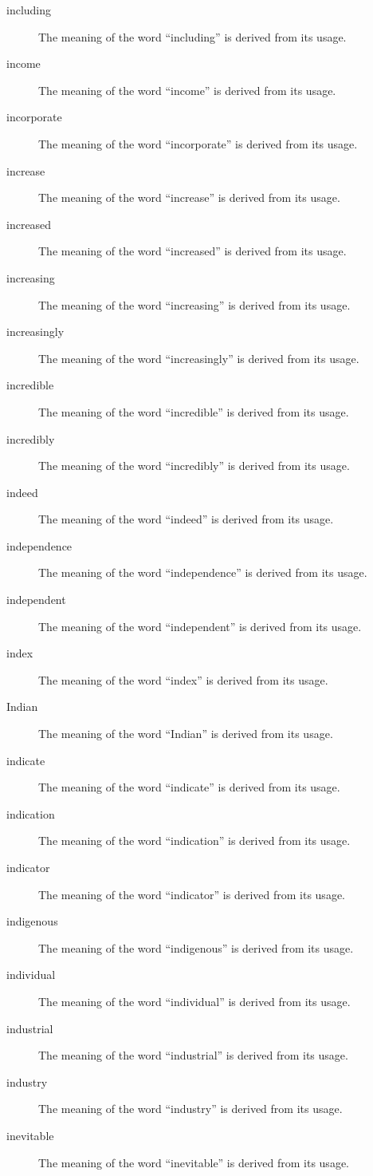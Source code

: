 \documentclass[12pt, letterpaper]{memoir}
\begin{document}
\begin{description}
\item[including] The meaning of the word ``including'' is derived from its usage.
\item[income] The meaning of the word ``income'' is derived from its usage.
\item[incorporate] The meaning of the word ``incorporate'' is derived from its usage.
\item[increase] The meaning of the word ``increase'' is derived from its usage.
\item[increased] The meaning of the word ``increased'' is derived from its usage.
\item[increasing] The meaning of the word ``increasing'' is derived from its usage.
\item[increasingly] The meaning of the word ``increasingly'' is derived from its usage.
\item[incredible] The meaning of the word ``incredible'' is derived from its usage.
\item[incredibly] The meaning of the word ``incredibly'' is derived from its usage.
\item[indeed] The meaning of the word ``indeed'' is derived from its usage.
\item[independence] The meaning of the word ``independence'' is derived from its usage.
\item[independent] The meaning of the word ``independent'' is derived from its usage.
\item[index] The meaning of the word ``index'' is derived from its usage.
\item[Indian] The meaning of the word ``Indian'' is derived from its usage.
\item[indicate] The meaning of the word ``indicate'' is derived from its usage.
\item[indication] The meaning of the word ``indication'' is derived from its usage.
\item[indicator] The meaning of the word ``indicator'' is derived from its usage.
\item[indigenous] The meaning of the word ``indigenous'' is derived from its usage.
\item[individual] The meaning of the word ``individual'' is derived from its usage.
\item[industrial] The meaning of the word ``industrial'' is derived from its usage.
\item[industry] The meaning of the word ``industry'' is derived from its usage.
\item[inevitable] The meaning of the word ``inevitable'' is derived from its usage.

\end{description}
\end{document}
